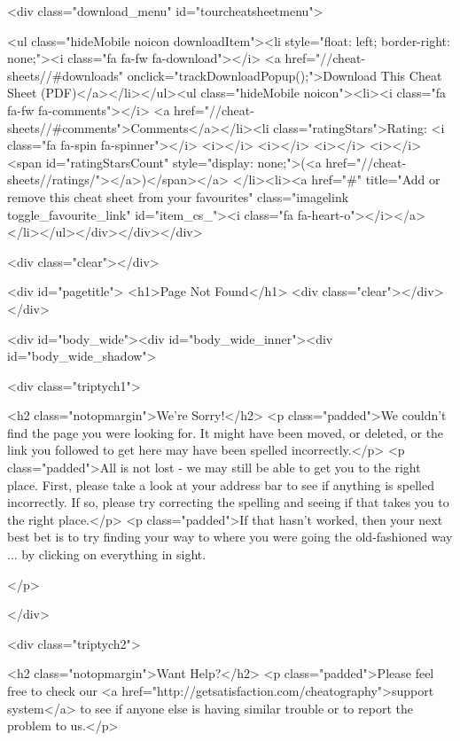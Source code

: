         <div class="download_menu" id="tourcheatsheetmenu">

        <ul class="hideMobile noicon downloadItem"><li style="float: left; border-right: none;"><i class="fa fa-fw fa-download"></i> <a href="//cheat-sheets//#downloads" onclick="trackDownloadPopup();">Download This Cheat Sheet (PDF)</a></li></ul><ul class="hideMobile noicon"><li><i class="fa fa-fw fa-comments"></i> <a href="//cheat-sheets//#comments">Comments</a></li><li class="ratingStars">Rating:
                <i class="fa fa-spin fa-spinner"></i> <i></i> <i></i> <i></i> <i></i> <span id="ratingStarsCount" style="display: none;">(<a href="//cheat-sheets//ratings/"></a>)</span></a>
            </li><li><a href="#" title="Add or remove this cheat sheet from your favourites" class="imagelink toggle_favourite_link" id="item_cs_"><i class="fa fa-heart-o"></i></a>
            </li></ul></div></div></div>
    
                   <div class="clear"></div>

                            <div id="pagetitle">
                    <h1>Page Not Found</h1>
                                        <div class="clear"></div>
                </div>
                    
        
        <div id="body_wide"><div id="body_wide_inner"><div id="body_wide_shadow">



    

    <div class="triptych1">

        <h2 class="notopmargin">We're Sorry!</h2>
        <p class="padded">We couldn't find the page you were looking for. It might have been moved, or deleted, or the link you followed to get here may have been spelled incorrectly.</p>
        <p class="padded">All is not lost - we may still be able to get you to the right place. First, please take a look at your address bar to see if anything is spelled incorrectly. If so, please try correcting the spelling and seeing if that takes you to the right place.</p>
        <p class="padded">If that hasn't worked, then your next best bet is to try finding your way to where you were going the old-fashioned way ... by clicking on everything in sight.

                    </p>
        
    </div>

    <div class="triptych2">

        <h2 class="notopmargin">Want Help?</h2>
        <p class="padded">Please feel free to check our <a href="http://getsatisfaction.com/cheatography">support system</a> to see if anyone else is having similar trouble or to report the problem to us.</p>


